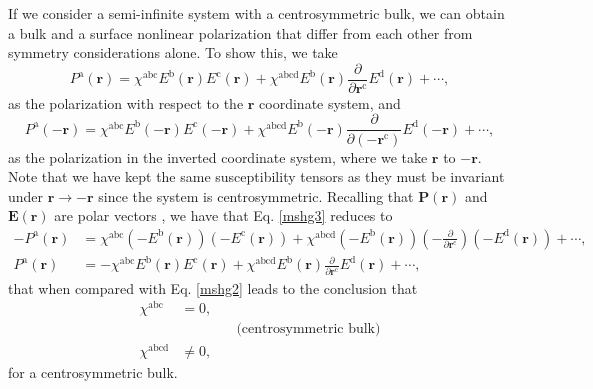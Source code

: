 If we consider a semi-infinite system with a centrosymmetric bulk, we can obtain
a bulk and a surface nonlinear polarization that differ from each other from
symmetry considerations alone. To show this, we take
\begin{equation}\label{mshg2}
P^{\mathrm{a}}(\mathbf{r})
= \chi^{\mathrm{abc}}E^{\mathrm{b}}(\mathbf{r})E^{\mathrm{c}}(\mathbf{r})
+ \chi^{\mathrm{abcd}}E^{\mathrm{b}}(\mathbf{r})
  \frac{\partial}{\partial\mathbf{r}^{\mathrm{c}}}E^{\mathrm{d}}(\mathbf{r}) 
+ \cdots,
\end{equation}
as the polarization with respect to the $\mathbf{r}$ coordinate system, and 
\begin{equation}\label{mshg3}
P^{\mathrm{a}}(-\mathbf{r})
= \chi^{\mathrm{abc}}E^{\mathrm{b}}(-\mathbf{r})E^{\mathrm{c}}(-\mathbf{r})
+ \chi^{\mathrm{abcd}}E^{\mathrm{b}}(-\mathbf{r})
  \frac{\partial}{\partial(-\mathbf{r}^{\mathrm{c}})}E^{\mathrm{d}}(-\mathbf{r}) 
+ \cdots, 
\end{equation}
as the polarization in the inverted coordinate system, where we take
$\mathbf{r}$ to $-\mathbf{r}$. Note that we have kept the same susceptibility
tensors as they must be invariant under $\mathbf{r} \to -\mathbf{r}$ since the
system is centrosymmetric. Recalling that $\mathbf{P}(\mathbf{r})$ and
$\mathbf{E}(\mathbf{r})$ are polar vectors
\cite{jacksonbook}, we have that Eq. \eqref{mshg3} reduces to
\begin{align}\label{mshg4}
-P^{\mathrm{a}}(\mathbf{r})
&= \chi^{\mathrm{abc}}(-E^{\mathrm{b}}(\mathbf{r}))(-E^{\mathrm{c}}(\mathbf{r}))
 + \chi^{\mathrm{abcd}}(-E^{\mathrm{b}}(\mathbf{r}))
(-\frac{\partial}{\partial\mathbf{r}^{\mathrm{c}}})(-E^{\mathrm{d}}(\mathbf{r})) 
 + \cdots,\nonumber\\
P^{\mathrm{a}}(\mathbf{r})
&= -\chi^{\mathrm{abc}}E^{\mathrm{b}}(\mathbf{r})E^{\mathrm{c}}(\mathbf{r})
 + \chi^{\mathrm{abcd}}E^{\mathrm{b}}(\mathbf{r})
   \frac{\partial}{\partial\mathbf{r}^{\mathrm{c}}}E^{\mathrm{d}}(\mathbf{r}) 
 + \cdots,
\end{align}
that when compared with Eq. \eqref{mshg2} leads to the conclusion that
\begin{equation}\label{sshg}
\begin{split}
\chi^{\mathrm{abc}} &= 0,\\
&\qquad\qquad\text{(centrosymmetric bulk)}\\
\chi^{\mathrm{abcd}} &\ne 0,
\end{split}
\end{equation}
for a centrosymmetric bulk.

